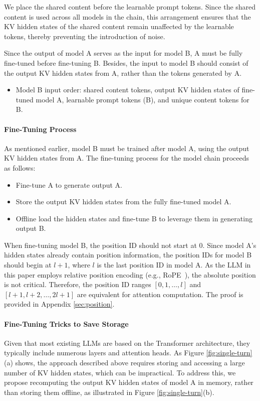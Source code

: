 We place the shared content before the learnable prompt tokens. Since the shared content is used across all models in the chain, this arrangement ensures that the KV hidden states of the shared content remain unaffected by the learnable tokens, thereby preventing the introduction of noise.


Since the output of model A serves as the input for model B,  A must be fully fine-tuned before fine-tuning B. Besides, the input to model B should consist of the output KV hidden states from A, rather than the tokens generated by A.

\begin{itemize} 
\item Model B input order: shared content tokens, output KV hidden states of fine-tuned model A, learnable prompt tokens (B), and unique content tokens for B.
\end{itemize}


\paragraph{Fine-Tuning Process}
As mentioned earlier, model B must be trained after model A, using the output KV hidden states from A. The fine-tuning process for the model chain proceeds as follows:

\begin{itemize}
\item Fine-tune A to generate output A. 
\item Store the output KV hidden states from the fully fine-tuned model A. 
\item Offline load the hidden states and fine-tune B to leverage them in generating output B. 
\end{itemize}

When fine-tuning model B, the position ID should not start at 0. Since model A's hidden states already contain position information, the position IDs for model B should begin at $l+1$, where $l$ is the last position ID in model A. As the LLM in this paper employs relative position encoding (e.g., RoPE~\cite{su2024roformer}), the absolute position is not critical. Therefore, the position ID ranges $[0, 1, \dots, l]$  and  $[l+1, l+2, \dots, 2l+1]$  are equivalent for attention computation. The proof is provided in Appendix \ref{sec:position}.

\paragraph{Fine-Tuning Tricks to Save Storage}
Given that most existing LLMs are based on the Transformer architecture, they typically include numerous layers and attention heads. As Figure \ref{fig:single-turn}(a) shows, the approach described above requires storing and accessing a large number of KV hidden states, which can be impractical. To address this, we propose recomputing the output KV hidden states of model A in memory, rather than storing them offline, as illustrated in Figure \ref{fig:single-turn}(b). 

